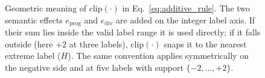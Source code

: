 \begin{figure}[h]
\caption{Geometric meaning of $\mathrm{clip}(\cdot)$ in Eq.~\eqref{eq:additive_rule}. The two semantic effects $e_{\text{prog}}$ and $e_{\text{div}}$ are added on the integer label axis. If their sum lies inside the valid label range it is used directly; if it falls outside (here $+2$ at three labels), $\mathrm{clip}(\cdot)$ snaps it to the nearest extreme label ($H$). The same convention applies symmetrically on the negative side and at five labels with support $\{-2,\dots,+2\}$.}
\label{fig:clip}
\end{figure}
